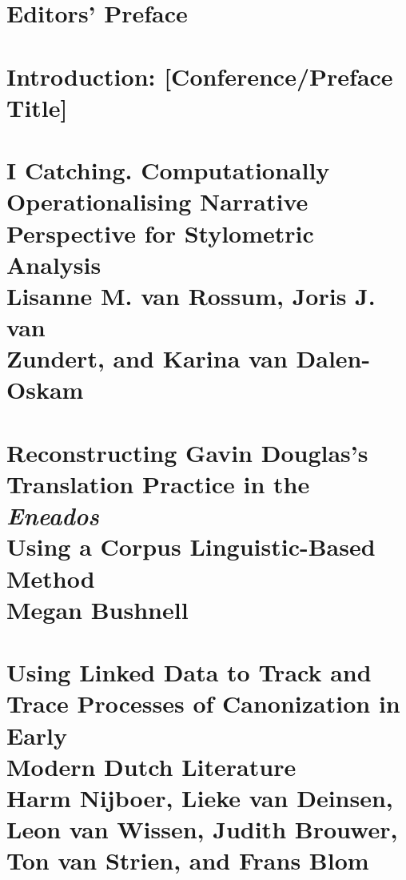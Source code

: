 \documentclass{book}
\newcommand\MyCmd[1]{\mbox{}\clearpage\setcounter{page}{#1}}
\begin{document}
 \tableofcontents
 \thispagestyle{empty}


\renewcommand{\partname}{}
\renewcommand{\thepart}{}
\renewcommand{\thesection}{}

\MyCmd{1}
\section{Editors' Preface}
\MyCmd{3}
\section{Introduction: [Conference/Preface Title]}
\MyCmd{3}

\MyCmd{1}
\section{\textbf{I Catching. Computationally \\ Operationalising Narrative Perspective for Stylometric Analysis} \\ 
Lisanne M. van Rossum, Joris J. van \\ Zundert, and Karina van Dalen-Oskam}
\MyCmd{13}
\section{\textbf{Reconstructing Gavin Douglas’s \\ Translation Practice in the \textit{Eneados} \\ Using a Corpus Linguistic-Based Method} \\ Megan Bushnell}
\MyCmd{39}
\section{\textbf{Using Linked Data to Track and Trace Processes of Canonization in Early \\ Modern Dutch Literature} \\ 
Harm Nijboer, Lieke van Deinsen, Leon van Wissen, Judith Brouwer, Ton van Strien, and Frans Blom}
\MyCmd{61}
\end{document}
